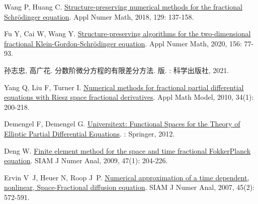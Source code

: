 \begin{thebibliography}{79}
    Wang P, Huang C.
    \newblock \href{https://linkinghub.elsevier.com/retrieve/pii/S0168927418300709}{Structure-preserving numerical methods for the fractional {{Schr{\"o}dinger}} equation}\allowbreak[J].
    \newblock Appl Numer Math, 2018, 129: 137-158.
    
    Fu Y, Cai W, Wang Y.
    \newblock \href{https://www.sciencedirect.com/science/article/pii/S0168927420301264}{Structure-preserving algorithms for the two-dimensional fractional {{Klein-Gordon-Schr{\"o}dinger}} equation}\allowbreak[J].
    \newblock Appl Numer Math, 2020, 156: 77-93.
    
    {孙志忠}, {高广花}.
    \newblock 分数阶微分方程的有限差分方法\allowbreak[M].
     版.
    : {科学出版社}, 2021.
    
    Yang Q, Liu F, Turner I.
    \newblock \href{https://www.sciencedirect.com/science/article/pii/S0307904X09001127}{Numerical methods for fractional partial differential equations with {{Riesz}} space fractional derivatives}\allowbreak[J].
    \newblock Appl Math Model, 2010, 34\allowbreak (1): 200-218.
    
    Demengel F, Demengel G.
    \newblock \href{http://link.springer.com/10.1007/978-1-4471-2807-6}{Universitext: Functional {{Spaces}} for the {{Theory}} of {{Elliptic Partial Differential Equations}}}\allowbreak[M].
    : {Springer}, 2012.
    
    Deng W.
    \newblock \href{https://doi.org/10.1137/080714130}{Finite element method for the space and time fractional {{Fokker}}{\textendash}{{Planck}} equation}\allowbreak[J].
    \newblock SIAM J Numer Anal, 2009, 47\allowbreak (1): 204-226.
    
    Ervin V~J, Heuer N, Roop J~P.
    \newblock \href{https://doi.org/10.1137/050642757}{Numerical approximation of a time dependent, nonlinear, {{Space}}-{{Fractional}} diffusion equation}\allowbreak[J].
    \newblock SIAM J Numer Anal, 2007, 45\allowbreak (2): 572-591.
    

\end{thebibliography}
